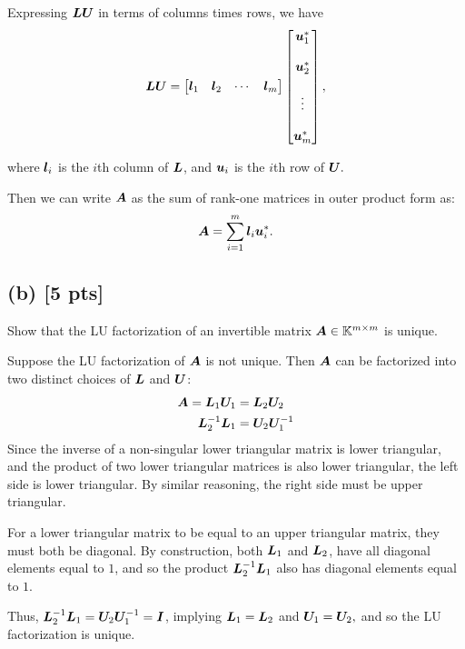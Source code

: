 \documentclass[twoside,10pt]{article}
\begin{document}
Expressing $\bm{L}\bm{U}$ in terms of columns times rows, we have
\begin{equation*}
  \bm{L}\bm{U} = \begin{bmatrix}\bm{l}_1 & \bm{l}_2 & \cdots & \bm{l}_m \end{bmatrix}
  \begin{bmatrix}\bm{u}_1^{*} \\\\ \bm{u}_2^{*} \\\\ \vdots \\\\ \bm{u}_m^{*}\end{bmatrix},
\end{equation*}

where $\bm{l}_i$ is the $i$th column of $\bm{L}$, and $\bm{u}_i$ is the $i$th row of $\bm{U}.$

Then we can write $\bm{A}$ as the sum of rank-one matrices in outer product form as:
\begin{equation*}
  \bm{A} = \sum_{i=1}^{m} \bm{l}_i \bm{u}_i^{*}.
\end{equation*}

\subsection*{(b) [5 pts]}
Show that the LU factorization of an invertible matrix $\bm{A} \in \mathbb{K}^{m \times m}$ is unique. 

Suppose the LU factorization of $\bm{A}$ is not unique.
Then $\bm{A}$ can be factorized into two distinct choices of $\bm{L}$ and $\bm{U}$:
\begin{align*}
\bm{A} = \bm{L}_1\bm{U}_1 &= \bm{L}_2\bm{U}_2\\
\bm{L}_2^{-1}\bm{L}_1 &= \bm{U}_2\bm{U}_1^{-1}
\end{align*}
Since the inverse of a non-singular lower triangular matrix is lower triangular, and the product of two lower triangular matrices is also lower triangular, the left side is lower triangular.
By similar reasoning, the right side must be upper triangular.

For a lower triangular matrix to be equal to an upper triangular matrix, they must both be diagonal.
By construction, both $\bm{L}_1$ and $\bm{L}_2$, have all diagonal elements equal to $1$, and so the product $\bm{L}_2^{-1}\bm{L}_1$ also has diagonal elements equal to $1$.

Thus, $\bm{L}_2^{-1}\bm{L}_1 = \bm{U}_2\bm{U}_1^{-1} = \bm{I}$, implying $\bm{L}_1 = \bm{L}_2$ and $\bm{U}_1 = \bm{U}_2,$ and so the LU factorization is unique.
\end{document}
